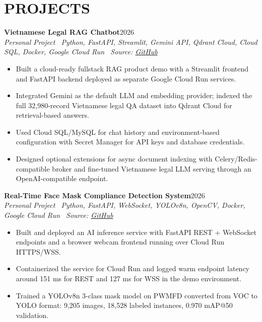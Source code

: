 \documentclass[10pt,a4paper]{article}
\newenvironment{cvitems}{%
    \begin{itemize}[leftmargin=1.2em,itemsep=0pt,topsep=1pt,parsep=0pt]
}{%
    \end{itemize}
}
\newcommand{\entryhead}[2]{%
    \noindent\textbf{#1}\hfill #2\\[-2pt]
}
\newcommand{\entrysub}[1]{%
    \noindent\textit{#1}\\[-1pt]
}
\begin{document}
\section{PROJECTS}
\entryhead{Vietnamese Legal RAG Chatbot}{2026}
\entrysub{Personal Project \textbar\ Python, FastAPI, Streamlit, Gemini API, Qdrant Cloud, Cloud SQL, Docker, Google Cloud Run \textbar\ Source: \href{https://github.com/NguyenKhacBao564/legal_RaG_Chatbot_VietNamese-System}{GitHub}}
\begin{cvitems}
    \item Built a cloud-ready fullstack RAG product demo with a Streamlit frontend and FastAPI backend deployed as separate Google Cloud Run services.
    \item Integrated Gemini as the default LLM and embedding provider; indexed the full 32,980-record Vietnamese legal QA dataset into Qdrant Cloud for retrieval-based answers.
    \item Used Cloud SQL/MySQL for chat history and environment-based configuration with Secret Manager for API keys and database credentials.
    \item Designed optional extensions for async document indexing with Celery/Redis-compatible broker and fine-tuned Vietnamese legal LLM serving through an OpenAI-compatible endpoint.
\end{cvitems}

\entryhead{Real-Time Face Mask Compliance Detection System}{2026}
\entrysub{Personal Project \textbar\ Python, FastAPI, WebSocket, YOLOv8n, OpenCV, Docker, Google Cloud Run \textbar\ Source: \href{https://github.com/NguyenKhacBao564/Real-Time-Face-Mask-Compliance-Detection-System}{GitHub}}
\begin{cvitems}
    \item Built and deployed an AI inference service with FastAPI REST + WebSocket endpoints and a browser webcam frontend running over Cloud Run HTTPS/WSS.
    \item Containerized the service for Cloud Run and logged warm endpoint latency around 151 ms for REST and 127 ms for WSS in the demo environment.
    \item Trained a YOLOv8n 3-class mask model on PWMFD converted from VOC to YOLO format: 9,205 images, 18,528 labeled instances, 0.970 mAP@50 validation.
\end{cvitems}
\end{document}
